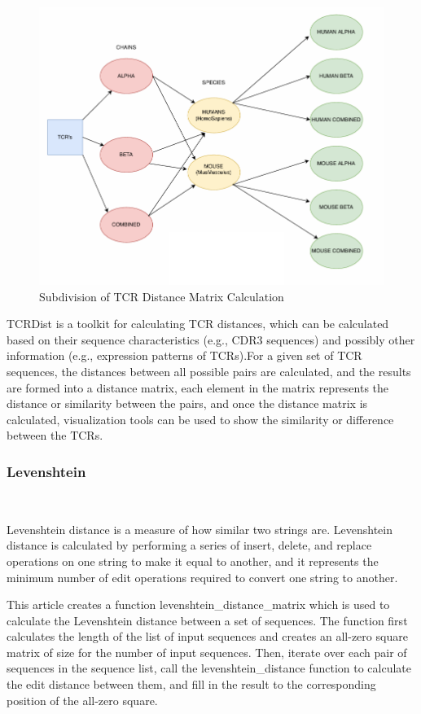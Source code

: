 \documentclass[conference]{IEEEtran}
\begin{document}
    \begin{figure}[h]
		    \centering
		    \includegraphics[width=0.5\linewidth]{fig1.png}
		    \caption{Subdivision of TCR Distance Matrix Calculation}
		    \label{fig:enter-label}
		\end{figure}
 
	TCRDist\cite{b2}\cite{b3} is a toolkit for calculating TCR distances, which can be calculated based on their sequence characteristics (e.g., CDR3 sequences) and possibly other information (e.g., expression patterns of TCRs).For a given set of TCR sequences, the distances between all possible pairs are calculated, and the results are formed into a distance matrix, each element in the matrix represents the distance or similarity between the pairs, and once the distance matrix is calculated, visualization tools can be used to show the similarity or difference between the TCRs.
    \\
	
	\subsubsection{Levenshtein} \
	
	Levenshtein distance is a measure of how similar two strings are. Levenshtein distance is calculated by performing a series of insert, delete, and replace operations on one string to make it equal to another, and it represents the minimum number of edit operations required to convert one string to another.
	
	This article creates a function levenshtein\_distance\_matrix which is used to calculate the Levenshtein distance between a set of sequences. The function first calculates the length of the list of input sequences and creates an all-zero square matrix of size for the number of input sequences. Then, iterate over each pair of sequences in the sequence list, call the levenshtein\_distance function to calculate the edit distance between them, and fill in the result to the corresponding position of the all-zero square.
	\\
\end{document}
